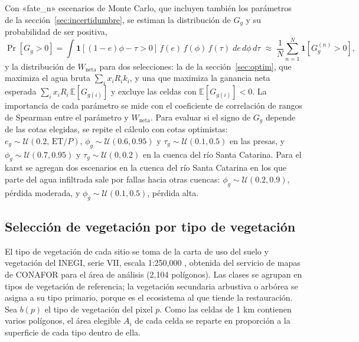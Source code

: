Con «fate_n» escenarios de Monte Carlo, que incluyen también los parámetros de la sección~\ref{sec:incertidumbre}, se estiman la distribución de $G_g$ y su probabilidad de ser positiva,
\begin{equation}
\Pr[G_g>0]=\int \mathbf 1\!\left[(1-e)\phi-\tau>0\right]\,f(e)\,f(\phi)\,f(\tau)\;de\,d\phi\,d\tau\;\approx\;\frac1N\sum_{n=1}^N \mathbf 1\!\left[G_g^{(n)}>0\right],
\end{equation}
y la distribución de $W_{\text{neta}}$ para dos selecciones: la de la sección~\ref{sec:optim}, que maximiza el agua bruta $\sum_i x_iR_ik_i$, y una que maximiza la ganancia neta esperada $\sum_i x_iR_i\,\mathbb E[G_{g(i)}]$ y excluye las celdas con $\mathbb E[G_{g(i)}]<0$. La importancia de cada parámetro se mide con el coeficiente de correlación de rangos de Spearman entre el parámetro y $W_{\text{neta}}$. Para evaluar si el signo de $G_g$ depende de las cotas elegidas, se repite el cálculo con cotas optimistas: $e_g\sim\mathcal U(0.2,\,\text{ET}/P)$, $\phi_g\sim\mathcal U(0.6,0.95)$ y $\tau_g\sim\mathcal U(0.1,0.5)$ en las presas, y $\phi_g\sim\mathcal U(0.7,0.95)$ y $\tau_g\sim\mathcal U(0,0.2)$ en la cuenca del río Santa Catarina. Para el karst se agregan dos escenarios en la cuenca del río Santa Catarina en los que parte del agua infiltrada sale por fallas hacia otras cuencas: $\phi_g\sim\mathcal U(0.2,0.9)$, pérdida moderada, y $\phi_g\sim\mathcal U(0.1,0.5)$, pérdida alta.

\subsection{Selección de vegetación por tipo de vegetación}\label{sec:vegetacion}

El tipo de vegetación de cada sitio se toma de la carta de uso del suelo y vegetación del INEGI, serie VII, escala 1:250,000 , obtenida del servicio de mapas de CONAFOR para el área de análisis (2,104 polígonos). Las clases se agrupan en tipos de vegetación de referencia; la vegetación secundaria arbustiva o arbórea se asigna a su tipo primario, porque es el ecosistema al que tiende la restauración. Sea $b(p)$ el tipo de vegetación del pixel $p$. Como las celdas de 1 km contienen varios polígonos, el área elegible $A_i$ de cada celda se reparte en proporción a la superficie de cada tipo dentro de ella.

